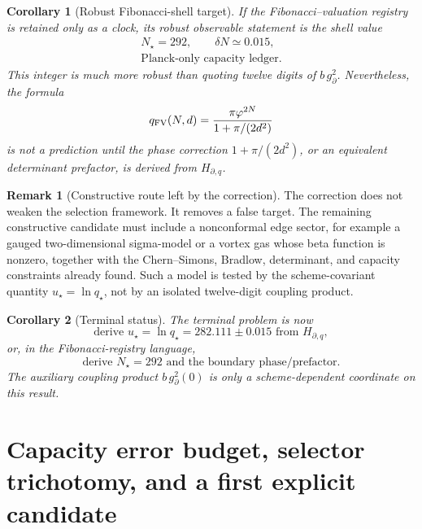 \documentclass[aps,prd,reprint,nofootinbib,superscriptaddress,floatfix]{revtex4-2}
\numberwithin{equation}{section}
\theoremstyle{definition}
\newtheorem{remark}{Remark}[section]
\theoremstyle{plain}
\newtheorem{corollary}{Corollary}[section]
\begin{document}
\begin{corollary}[Robust Fibonacci-shell target]\label{cor:shell-target}
If the Fibonacci--valuation registry is retained only as a clock, its robust
observable statement is the shell value
\begin{equation}
\boxed{
\begin{gathered}
        N_\star=292,\qquad \delta N\simeq0.015,\\
        \text{Planck-only capacity ledger.}
\end{gathered}}
\end{equation}
This integer is much more robust than quoting twelve digits of
\(b\,g_\partial^2\).  Nevertheless, the formula
\[
q_{\rm FV}(N,d)
=
\frac{\pi\varphi^{2N}}{1+\pi/(2d^2)}
\]
is not a prediction until the phase correction \(1+\pi/(2d^2)\), or an
equivalent determinant prefactor, is derived from \(H_{\partial,q}\).
\end{corollary}

\begin{remark}[Constructive route left by the correction]
The correction does not weaken the selection framework.  It removes a false target.  The
remaining constructive candidate must include a nonconformal edge sector, for
example a gauged two-dimensional sigma-model or a vortex gas whose beta
function is nonzero, together with the Chern--Simons, Bradlow, determinant, and
capacity constraints already found.  Such a model is tested by the
scheme-covariant quantity \(u_\star=\ln q_\star\), not by an isolated
twelve-digit coupling product.
\end{remark}

\begin{corollary}[Terminal status]\label{cor:terminal-status}
The terminal problem is now
\[
\boxed{
\text{derive }u_\star=\ln q_\star=282.111\pm0.015
\text{ from }H_{\partial,q},
}
\]
or, in the Fibonacci-registry language,
\[
\boxed{
\text{derive }N_\star=292
\text{ and the boundary phase/prefactor.}
}
\]
The auxiliary coupling product \(b\,g_\partial^2(0)\) is only a
scheme-dependent coordinate on this result.
\end{corollary}




\section{Capacity error budget, selector trichotomy, and a first explicit candidate}
\label{sec:universality-classes}
\end{document}
